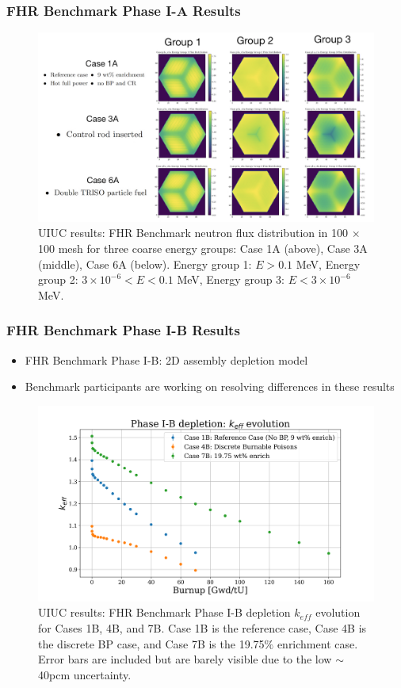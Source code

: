 \begin{frame}
    \frametitle{FHR Benchmark Phase I-A Results}
    \begin{figure}[]
        \centering
        \includegraphics[width=0.9\linewidth]{figures/phase1a-e.png} 
        \vspace{-0.2cm}
        \caption{UIUC results: FHR Benchmark neutron flux 
        distribution in 100 $\times$ 100 mesh for three coarse energy groups: Case 
        1A (above), Case 3A (middle), Case 6A (below). Energy group 1: $E > 0.1$ MeV, 
        Energy group 2: $3 \times 10^{-6} < E < 0.1$ MeV, Energy group 3: $E < 3 \times 10^{-6}$ MeV. }
    \end{figure}
\end{frame}

\begin{frame}
    \frametitle{FHR Benchmark Phase I-B Results}
    \begin{itemize}
        \item FHR Benchmark Phase I-B: 2D assembly depletion model
        \item Benchmark participants are working on resolving differences in 
        these results
    \end{itemize}
    \vspace{-0.2cm}
    \begin{figure}[]
        \centering
        \includegraphics[width=0.75\linewidth]{../docs/figures/phase1b_keff.png} 
        \caption{UIUC results: FHR Benchmark Phase I-B depletion 
        $k_{eff}$ evolution for Cases 1B, 4B, and 7B. Case 1B is the reference case, 
        Case 4B is the discrete \acrlong{BP} case, and Case 7B is the 19.75$\%$ 
        enrichment case. Error bars are included but are barely visible due to the 
        low $\sim$40pcm uncertainty.}
    \end{figure}
\end{frame}